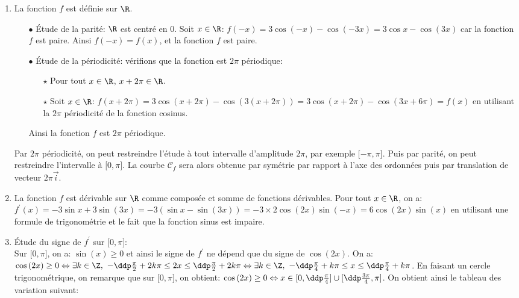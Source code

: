 \begin{correction}  \;
\begin{enumerate}
\item La fonction $f$ est d\'efinie sur $\R$.
\begin{itemize}
\item[$\bullet$] \'Etude de la parit\'e: $\R$ est centr\'e en 0. Soit $x\in\R$: $f(-x)=3\cos{(-x)}-\cos{(-3x)}=3\cos{x}-\cos{(3x)}$ car la fonction $f$ est paire. Ainsi $f(-x)=f(x)$, et la fonction $f$ est paire.
\item[$\bullet$] \'Etude de la p\'eriodicit\'e: v\'erifions que la fonction est $2\pi$ p\'eriodique:
\begin{itemize}
\item[$\star$] Pour tout $x\in\R$, $x+2\pi\in\R$. 
\item[$\star$] Soit $x\in\R$: $f(x+2\pi)=3\cos{(x+2\pi)}-\cos{(3(x+2\pi))}=3\cos{(x+2\pi)}-\cos{(3x+6\pi)}=f(x)$ en utilisant la $2\pi$ p\'eriodicit\'e de la fonction cosinus.
\end{itemize}
Ainsi la fonction $f$ est $2\pi$ p\'eriodique. 
\end{itemize}
Par $2\pi$ p\'eriodicit\'e, on peut restreindre l'\'etude \`{a} tout intervalle d'amplitude $2\pi$, par exemple $\lbrack -\pi,\pi\rbrack$. Puis par parit\'e, on peut restreindre l'intervalle \`{a} $\lbrack 0,\pi\rbrack$. La courbe $\mathcal{C}_f$ sera alors obtenue par sym\'etrie par rapport \`{a} l'axe des ordonn\'ees puis par translation de vecteur $2\pi\vec{i}$. 
\item La fonction $f$ est d\'erivable sur $\R$ comme compos\'ee et somme de fonctions d\'erivables. Pour tout $x\in\R$, on a: $f^{\prime}(x)=-3\sin{x}+3\sin{(3x)}=-3( \sin{x}-\sin{(3x)} )= -3 \times 2\cos{(2x)}\sin{( -x)}=6\cos{(2x)}\sin{( x)} $ en utilisant une formule de trigonom\'etrie et le fait que la fonction sinus est impaire. 
\item  \'Etude du signe de $f^{\prime}$ sur $\lbrack 0,\pi\rbrack$:\\
\noindent Sur $\lbrack 0,\pi\rbrack$, on a: $\sin{(x)}\geq 0$ et ainsi le signe de $f^{\prime}$ ne d\'epend que du signe de $\cos{(2x)}$. On a: $\cos{(2x)}\geq 0\Leftrightarrow \exists k\in\Z,\ -\ddp\frac{\pi}{2}+2k\pi\leq 2x \leq \ddp\frac{\pi}{2}+2k\pi\Leftrightarrow \exists k\in\Z,\ -\ddp\frac{\pi}{4}+k\pi\leq x \leq \ddp\frac{\pi}{4}+k\pi$. En faisant un cercle trigonom\'etrique, on remarque que sur $\lbrack 0,\pi\rbrack$, on obtient: $\cos{(2x)}\geq 0\Leftrightarrow x\in\lbrack 0,\ddp\frac{\pi}{4}\rbrack\cup \lbrack \ddp\frac{3\pi}{4},\pi\rbrack$. On obtient ainsi le tableau des variation suivant:

\end{enumerate}
\end{correction}
